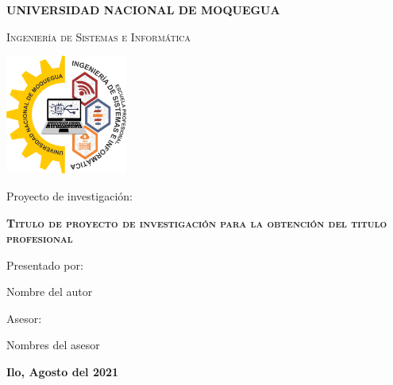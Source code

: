 \documentclass[12pt]{report}
\begin{document}
\begin{titlepage}
\centering
{\bfseries\LARGE UNIVERSIDAD NACIONAL DE MOQUEGUA \par}
\vspace{0.2cm}
{\scshape\LARGE Ingeniería de Sistemas e Informática \par}
\vspace{1cm}
{\includegraphics[width=0.3\textwidth]{Logo_EPISI.png}\par}
\vspace{1cm}
{\Large Proyecto de investigación:  \par}
\vspace{1cm}

{\bfseries\scshape\LARGE Titulo de proyecto de investigación para la obtención del titulo profesional \par}
\vspace{1cm}
{\Large Presentado por: \par}
{\Large Nombre del autor  \par}
\vfill
{\Large Asesor: \par}
{\Large Nombres del asesor \par}
\vfill
{\bfseries\Large Ilo, Agosto del 2021 \par}
\end{titlepage}





\tableofcontents
\listoffigures
\listoftables
\newpage
\end{document}
